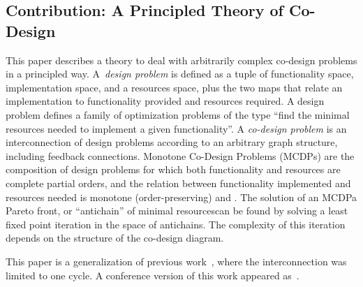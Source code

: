 \subsection{Contribution: A Principled Theory of Co-Design}

This paper describes a theory to deal with arbitrarily complex co-design problems in a principled way.
A~\emph{design problem} is defined as a tuple of functionality space, implementation space, and a resources space, plus the two maps that relate an implementation to functionality provided and resources required.
A design problem defines a family of optimization problems of the type ``find the minimal resources needed to implement a given functionality''.
A \emph{co-design problem} is an interconnection of design problems according to an arbitrary graph structure, including feedback connections.
Monotone Co-Design Problems (MCDPs) are the composition of design problems for which both functionality and resources are complete partial orders, and the relation between functionality implemented and resources needed is monotone (order-preserving) and \scottcontinuous.
The solution of an MCDP\textemdash a Pareto front, or ``antichain'' of minimal resources\textemdash can be found by solving a least fixed point iteration in the space of antichains.
The complexity of this iteration depends on the structure of the co-design diagram.

This paper is a generalization of previous work~\cite{censi15monotone}, where the interconnection was limited to one cycle.
A conference version of this work appeared as~\cite{censi15same}.


